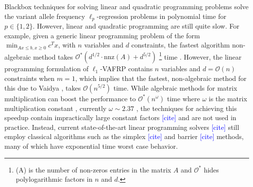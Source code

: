 \documentclass[10pt]{article}
\newcommand{\henri}[1]{\textcolor{blue}{[#1]}}
\begin{document}
Blackbox techniques for solving linear and quadratic programming problems solve the variant allele frequency
$\ell_p$-regression problems in polynomial time for $p \in \{1, 2\}$. However, 
linear and quadratic programming are still quite slow. For example, given a generic linear programming
problem of the form $\min_{Ax \leq b, x \geq 0} c^Tx$, with $n$ variables and $d$ constraints, the fastest
algorithm non-algebraic method \cite{cohen2021solving} takes 
$\mathcal{O}^*(d^{1/2}\cdot\text{nnz}(A)+d^{5/2})$ \footnote{(A) is the number of non-zeros entries in the 
    matrix $A$ and $\mathcal{O}^*$ hides polylogarithmic factors in $n$ and $d$.} time \cite{lee2014path, lee2015efficient}. 
However, the linear programming formulation of $\ell_1$-VAFRP contains $n$ variables and 
$d = \mathcal{O}(n)$ constraints when $m = 1$, which implies that the fastest, non-algebraic method for this due to 
Vaidya \cite{vaidya1987algorithm, vaidya1996new}, takes $\mathcal{O}(n^{5/2})$ time. While algebraic methods
for matrix multiplication can boost the performance to $\mathcal{O}^*(n^{\omega})$ time where $\omega$ is
the matrix multiplication constant \cite{cohen2021solving}, currently $\omega \sim 2.37$ 
\cite{alman2021refined}, the techniques for achieving this speedup contain
impractically large constant factors \henri{cite} and are not used in practice.
Instead, current state-of-the-art linear programming solvers \henri{cite} still employ classical algorithms such
as the simplex \henri{cite} and barrier \henri{cite} methods, many of which have exponential time 
worst case behavior.



\end{document}
